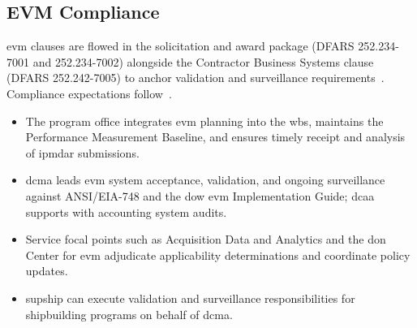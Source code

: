 \documentclass[../main.tex]{subfiles}
\begin{document}
\subsection{EVM Compliance}
\ac{evm} clauses are flowed in the solicitation and award package (DFARS 252.234-7001 and 252.234-7002) alongside the Contractor Business Systems clause (DFARS 252.242-7005) to anchor validation and surveillance requirements~\autocite{DFARS}. Compliance expectations follow~\autocite{edo-3-6-1-evm-intro-2025,DoDI5000-85}.
\begin{itemize}
	\item The program office integrates \ac{evm} planning into the \ac{wbs}, maintains the Performance Measurement Baseline, and ensures timely receipt and analysis of \ac{ipmdar} submissions.
	\item \ac{dcma} leads \ac{evm} system acceptance, validation, and ongoing surveillance against ANSI/EIA-748 and the \ac{dow} \ac{evm} Implementation Guide; \ac{dcaa} supports with accounting system audits.
	\item Service focal points such as Acquisition Data and Analytics and the \ac{don} Center for \ac{evm} adjudicate applicability determinations and coordinate policy updates.
	\item \ac{supship} can execute validation and surveillance responsibilities for shipbuilding programs on behalf of \ac{dcma}.
\end{itemize}
\end{document}
